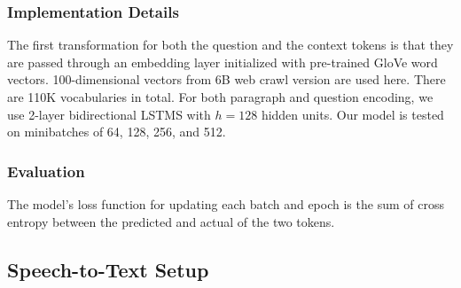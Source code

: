 \subsubsection{Implementation Details}

The first transformation for both the question and the context tokens is that they are passed through an embedding layer initialized with pre-trained GloVe word vectors. 100-dimensional vectors from 6B web crawl version are used here. There are 110K vocabularies in total. For both paragraph and question encoding, we use 2-layer bidirectional LSTMS with $h = 128$ hidden units. Our model is tested on minibatches of 64, 128, 256, and 512. 



\subsubsection{Evaluation}

The model's loss function for updating each batch and epoch is the sum of cross entropy between the predicted and actual of the two tokens. 


\subsection{Speech-to-Text Setup}


